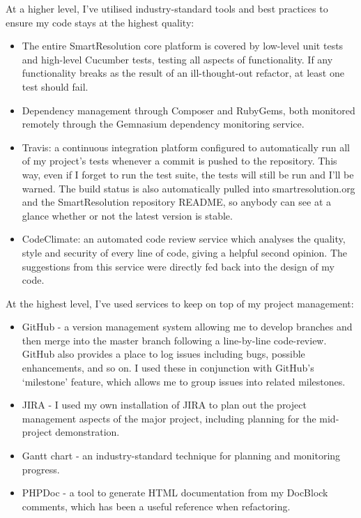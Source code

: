 At a higher level, I've utilised industry-standard tools and best practices to ensure my code stays at the highest quality:

\begin{itemize}
\item The entire SmartResolution core platform is covered by low-level unit tests and high-level Cucumber tests, testing all aspects of functionality. If any functionality breaks as the result of an ill-thought-out refactor, at least one test should fail.
\item Dependency management through Composer and RubyGems, both monitored remotely through the Gemnasium dependency monitoring service.
\item Travis: a continuous integration platform configured to automatically run all of my project's tests whenever a commit is pushed to the repository. This way, even if I forget to run the test suite, the tests will still be run and I'll be warned. The build status is also automatically pulled into smartresolution.org and the SmartResolution repository README, so anybody can see at a glance whether or not the latest version is stable.
\item CodeClimate: an automated code review service which analyses the quality, style and security of every line of code, giving a helpful second opinion. The suggestions from this service were directly fed back into the design of my code.
\end{itemize}

At the highest level, I've used services to keep on top of my project management:

\begin{itemize}
\item GitHub - a version management system allowing me to develop branches and then merge into the master branch following a line-by-line code-review. GitHub also provides a place to log issues including bugs, possible enhancements, and so on. I used these in conjunction with GitHub's `milestone' feature, which allows me to group issues into related milestones.
\item JIRA - I used my own installation of JIRA to plan out the project management aspects of the major project, including planning for the mid-project demonstration.
\item Gantt chart - an industry-standard technique for planning and monitoring progress.
\item PHPDoc - a tool to generate HTML documentation from my DocBlock comments, which has been a useful reference when refactoring.
\end{itemize}

